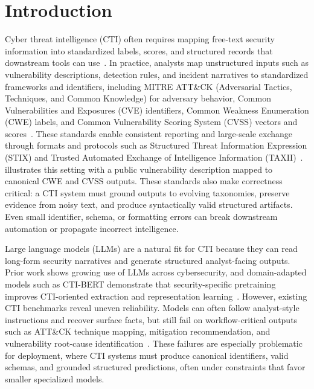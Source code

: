 \section{Introduction}

Cyber threat intelligence (CTI) often requires mapping free-text security information into standardized labels, scores, and structured records that downstream tools can use~\citep{xu2024llm4security}. In practice, analysts map unstructured inputs such as vulnerability descriptions, detection rules, and incident narratives to standardized frameworks and identifiers, including MITRE ATT\&CK (Adversarial Tactics, Techniques, and Common Knowledge) for adversary behavior, Common Vulnerabilities and Exposures (CVE) identifiers, Common Weakness Enumeration (CWE) labels, and Common Vulnerability Scoring System (CVSS) vectors and scores~\citep{mitre_attack,nvd,cwe,cvss_v31}. These standards enable consistent reporting and large-scale exchange through formats and protocols such as Structured Threat Information Expression (STIX) and Trusted Automated Exchange of Intelligence Information (TAXII)~\citep{strom2020attack,oasis2021stix,oasis2021taxii}.  illustrates this setting with a public vulnerability description mapped to canonical CWE and CVSS outputs. These standards also make correctness critical: a CTI system must ground outputs to evolving taxonomies, preserve evidence from noisy text, and produce syntactically valid structured artifacts. Even small identifier, schema, or formatting errors can break downstream automation or propagate incorrect intelligence.

Large language models (LLMs) are a natural fit for CTI because they can read long-form security narratives and generate structured analyst-facing outputs. Prior work shows growing use of LLMs across cybersecurity, and domain-adapted models such as CTI-BERT demonstrate that security-specific pretraining improves CTI-oriented extraction and representation learning~\citep{xu2024llm4security,parkyou2023ctibert}. However, existing CTI benchmarks reveal uneven reliability. Models can often follow analyst-style instructions and recover surface facts, but still fail on workflow-critical outputs such as ATT\&CK technique mapping, mitigation recommendation, and vulnerability root-cause identification~\citep{ji2024sevenllm,alam2024ctibench,liu2024cyberbench}. These failures are especially problematic for deployment, where CTI systems must produce canonical identifiers, valid schemas, and grounded structured predictions, often under constraints that favor smaller specialized models.

